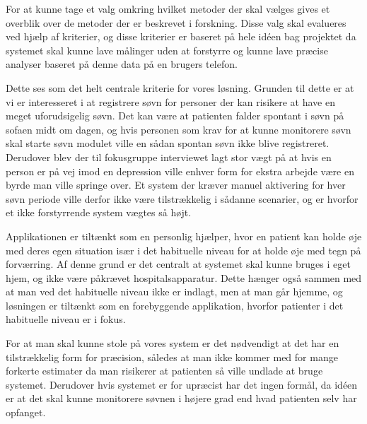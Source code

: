 For at kunne tage et valg omkring hvilket metoder der skal vælges gives et overblik over de metoder der er beskrevet i forskning.
Disse valg skal evalueres ved hjælp af kriterier, og disse kriterier er baseret på hele idéen bag projektet da systemet skal kunne lave målinger uden at forstyrre og kunne lave præcise analyser baseret på denne data på en brugers telefon. 

\begin{description}[style=nextline]
\item[Undgå bruger intervention og måler søvn uden at forstyrre]
Dette ses som det helt centrale kriterie for vores løsning.
Grunden til dette er at vi er interesseret i at registrere søvn for personer der kan risikere at have en meget uforudsigelig søvn. Det kan være at patienten falder spontant i søvn på sofaen midt om dagen, og hvis personen som krav for at kunne monitorere søvn skal starte søvn modulet ville en sådan spontan søvn ikke blive registreret.
Derudover blev der til fokusgruppe interviewet \citep[Kapitel 1, Sektion 5]{misc:faellesrapp} lagt stor vægt på at hvis en person er på vej imod en depression ville enhver form for ekstra arbejde være en byrde man ville springe over.
Et system der kræver manuel aktivering for hver søvn periode ville derfor ikke være tilstrækkelig i sådanne scenarier, og er hvorfor et ikke forstyrrende system vægtes så højt.

\item[Kunne bruges af brugere i deres eget hjem]
Applikationen er tiltænkt som en personlig hjælper, hvor en patient kan holde øje med deres egen situation især i det habituelle niveau for at holde øje med tegn på forværring.
Af denne grund er det centralt at systemet skal kunne bruges i eget hjem, og ikke være påkrævet hospitalsapparatur.
Dette hænger også sammen med at man ved det habituelle niveau ikke er indlagt, men at man går hjemme, og løsningen er tiltænkt som en forebyggende applikation, hvorfor patienter i det habituelle niveau er i fokus.

\item[Være præcis og hvis den kan måle søvnforstyrrelser er dette en fordel]
For at man skal kunne stole på vores system er det nødvendigt at det har en tilstrækkelig form for præcision, således at man ikke kommer med for mange forkerte estimater da man risikerer at patienten så ville undlade at bruge systemet. 
Derudover hvis systemet er for upræcist har det ingen formål, da idéen er at det skal kunne monitorere søvnen i højere grad end hvad patienten selv har opfanget.
\end{description}

